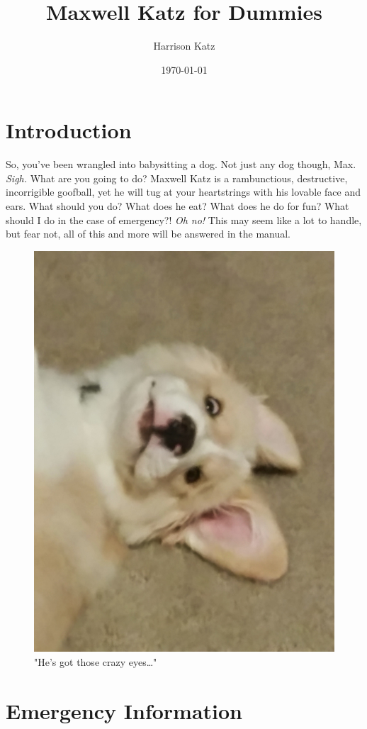 \documentclass[pdftex,12pt]{article}
\title{Maxwell Katz for Dummies}
\author{Harrison Katz}
\date{\today}
\begin{document}



\newpage
\tableofcontents

\newpage
\listoffigures

\newpage
{}

\section{Introduction}

So, you've been wrangled into babysitting a dog. Not just any dog though, Max.
\emph{Sigh.} What are you going to do? Maxwell Katz is a rambunctious,
destructive, incorrigible goofball, yet he will tug at your heartstrings with
his lovable face and ears. What should you do? What does he eat? What does he
do for fun? What should I do in the case of emergency?! \emph{Oh no!} This may
seem like a lot to handle, but fear not, all of this and more will be answered
in the manual.

\bigskip

\begin{figure}[h!]
    \centering
    \includegraphics[width=.35\textwidth]{./images/max/crazy_eyes.jpg}
    \caption{"He's got those crazy eyes\ldots"}
    \label{fig:crazy_eyes}
\end{figure}

\newpage
\section{Emergency Information}
\end{document}
